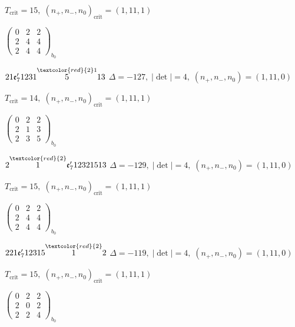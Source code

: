 \documentclass[10pt]{article}
\begin{document}
\hspace{1em}$T_{\text{crit}}=15,\; (n_+,n_-,n_0)_{\text{crit}}=(1,11,1)$

\hspace{2em}$\left(\begin{smallmatrix}0 & 2 & 2 \\ 2 & 4 & 4 \\ 2 & 4 & 4\end{smallmatrix}\right)_{\!b_0}$

$21\mathfrak{e}_7'1231\overset{\textcolor{red}{2}1}{5}13$ \quad $\Delta=-127,\; |\det|=4,\; (n_+,n_-,n_0)=(1,11,0)$

\hspace{1em}$T_{\text{crit}}=14,\; (n_+,n_-,n_0)_{\text{crit}}=(1,11,1)$

\hspace{2em}$\left(\begin{smallmatrix}0 & 2 & 2 \\ 2 & 1 & 3 \\ 2 & 3 & 5\end{smallmatrix}\right)_{\!b_0}$

\smallskip

$2\overset{\textcolor{red}{2}}{1}\mathfrak{e}_7'12321513$ \quad $\Delta=-129,\; |\det|=4,\; (n_+,n_-,n_0)=(1,11,0)$

\hspace{1em}$T_{\text{crit}}=15,\; (n_+,n_-,n_0)_{\text{crit}}=(1,11,1)$

\hspace{2em}$\left(\begin{smallmatrix}0 & 2 & 2 \\ 2 & 4 & 4 \\ 2 & 4 & 4\end{smallmatrix}\right)_{\!b_0}$

\smallskip

$221\mathfrak{e}_7'12315\overset{\textcolor{red}{2}}{1}2$ \quad $\Delta=-119,\; |\det|=4,\; (n_+,n_-,n_0)=(1,11,0)$

\hspace{1em}$T_{\text{crit}}=15,\; (n_+,n_-,n_0)_{\text{crit}}=(1,11,1)$

\hspace{2em}$\left(\begin{smallmatrix}0 & 2 & 2 \\ 2 & 0 & 2 \\ 2 & 2 & 4\end{smallmatrix}\right)_{\!b_0}$
\end{document}
